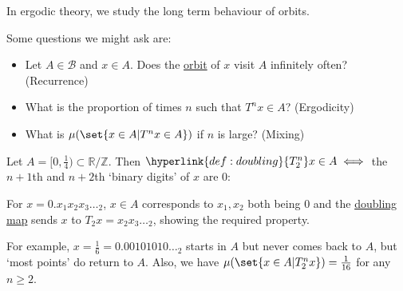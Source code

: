 \documentclass{article}
\begin{document}
In ergodic theory, we study the long term behaviour of orbits.
Some questions we might ask are:
\begin{itemize}
  \item Let $A \in \mathcal{B}$ and $x \in A$.
    Does the \hyperlink{def:orbit}{orbit} of $x$ visit $A$ infinitely often? (Recurrence)
  \item What is the proportion of times $n$ such that $T^n x \in A$? (Ergodicity)
  \item What is $\mu(\set{x \in A | T^n x \in A})$ if $n$ is large? (Mixing)
\end{itemize}

\begin{eg}
  Let $A = [0, \frac{1}{4}) \subset \mathbb{R}/\mathbb{Z}$. %
  Then $\hyperlink{def:doubling}{T_2^n} x \in A \iff $ the $n+1$th and $n+2$th `binary digits' of $x$ are $0$:

  For $x = 0.x_1 x_2 x_3 \dots_2$, $x \in A$ corresponds to $x_1, x_2$ both being 0 and the \hyperlink{def:doubling}{doubling map} sends $x$ to $T_2x = x_2 x_3 \dots_2$, showing the required property.

  For example, $x = \frac{1}{6} = 0.00101010\dots_2$ starts in $A$ but never comes back to $A$, but `most points' do return to $A$.
  Also, we have $\mu(\set{x \in A | T_2^n x}) = \frac{1}{16}$ for any $n \geq 2$.
\end{eg}
\end{document}
